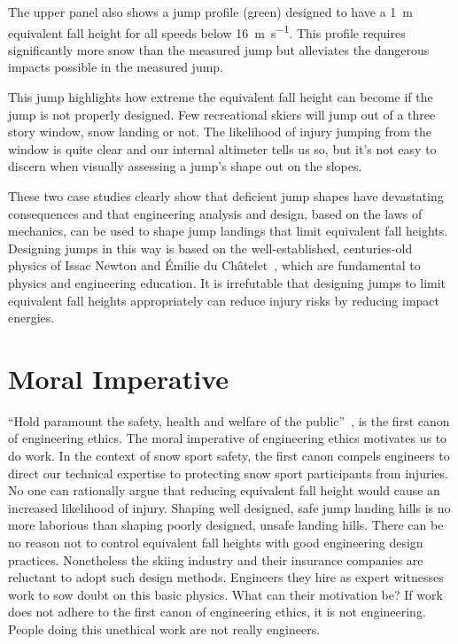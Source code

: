 \documentclass[smallextended]{svjour3}       %
\begin{document}
The upper panel also shows a jump profile (green) designed to have a
1~\si{\meter} equivalent fall height for all speeds below
16~\si{\meter\per\second}. This profile requires significantly more snow than
the measured jump but alleviates the dangerous impacts possible in the measured
jump.

This jump highlights how extreme the equivalent fall height can become if the jump
is not properly designed. Few recreational skiers will jump out of a three
story window, snow landing or not. The likelihood of injury jumping from the window is quite clear and
our internal altimeter tells us so, but it's not easy to discern when visually assessing a jump's shape out on the slopes.

These two case studies clearly show that deficient jump shapes have
devastating consequences and that engineering analysis and design, based on the
laws of mechanics, can be used to shape jump landings that limit equivalent
fall heights. Designing jumps in this way is based on the well-established,
centuries-old physics of Issac Newton and Émilie du Châtelet~\cite{Zinsser2007},
which are fundamental to physics and engineering education. It is irrefutable that
designing jumps to limit equivalent fall heights appropriately can reduce injury risks by reducing impact energies.

\section{Moral Imperative}
\label{sec:moral}
%
``Hold paramount the safety, health and welfare of the
public''~\cite{NSPE2019}, is the first canon of engineering ethics. The moral imperative of engineering ethics motivates us to do work. In the context of snow sport safety, the first canon
compels engineers to direct our technical expertise to protecting snow sport
participants from injuries. No one can rationally argue that reducing
equivalent fall height would cause an increased likelihood of injury. Shaping well designed, safe jump landing hills is no more laborious than shaping poorly designed, unsafe landing hills. There can be no reason not to control
equivalent fall heights with good engineering design practices. Nonetheless the skiing
industry and their insurance companies are reluctant to adopt such design methods. Engineers they hire as expert witnesses work to sow doubt on this basic physics. What can their motivation be? If work does not adhere to the first canon of engineering ethics, it is not engineering. People doing this unethical work are not really engineers.
\end{document}

